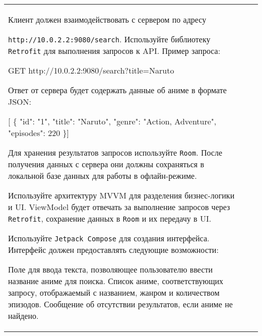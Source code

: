 \documentclass[a4paper]{article}
\begin{document}
\begin{tabular}{!{\vrule width 2pt}p{5cm}|p{6cm}|p{4cm}!{\vrule width 2pt}}
{\begin{minipage}{16cm}
\begin{enumerate}

Клиент должен взаимодействовать с сервером по адресу 

\texttt{http://10.0.2.2:9080/search}. Используйте библиотеку \texttt{Retrofit} для выполнения запросов к API. Пример запроса:

 GET http://10.0.2.2:9080/search?title=Naruto 

Ответ от сервера будет содержать данные об аниме в формате JSON:

 [ \{ "id": "1", "title": "Naruto", 
    "genre": "Action, Adventure", "episodes": 220 \}] 


Для хранения результатов запросов используйте \texttt{Room}. После получения данных с сервера они должны сохраняться в локальной базе данных для работы в офлайн-режиме.


Используйте архитектуру MVVM для разделения бизнес-логики и UI. ViewModel будет отвечать за выполнение запросов через \texttt{Retrofit}, сохранение данных в \texttt{Room} и их передачу в UI.


Используйте \texttt{Jetpack Compose} для создания интерфейса. Интерфейс должен предоставлять следующие возможности:

Поле для ввода текста, позволяющее пользователю ввести название аниме для поиска.
Список аниме, соответствующих запросу, отображаемый с названием, жанром и количеством эпизодов.
Сообщение об отсутствии результатов, если аниме не найдено.


\end{enumerate}
\end{minipage}}
\end{tabular}
\end{document}
